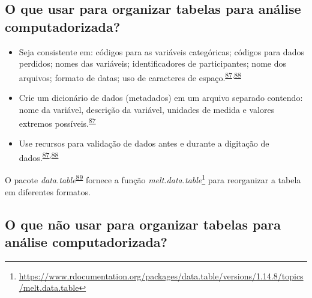 \documentclass[
  a4paper,
]{book}
\renewcommand{\href}[2]{#2\footnote{\url{#1}}}
\newenvironment{infobox}[1]
  {
  \begin{itemize}
  \renewcommand{\labelitemi}{
    \raisebox{-.7\height}[0pt][0pt]{
      {\setkeys{Gin}{width=3em,keepaspectratio}
        \texttt{[image: \#1]}}
    }
  }
  \setlength{\fboxsep}{1em}
  \begin{blackbox}
  \item
  }
  {
  \end{blackbox}
  \end{itemize}
  }
\begin{document}
\hypertarget{o-que-usar-para-organizar-tabelas-para-anuxe1lise-computadorizada}{%
\subsection{O que usar para organizar tabelas para análise computadorizada?}\label{o-que-usar-para-organizar-tabelas-para-anuxe1lise-computadorizada}}

\begin{itemize}
\item
  Seja consistente em: códigos para as variáveis categóricas; códigos para dados perdidos; nomes das variáveis; identificadores de participantes; nome dos arquivos; formato de datas; uso de caracteres de espaço.\textsuperscript{\protect\hyperlink{ref-broman2018}{87},\protect\hyperlink{ref-Juluru2015}{88}}
\item
  Crie um dicionário de dados (metadados) em um arquivo separado contendo: nome da variável, descrição da variável, unidades de medida e valores extremos possíveis.\textsuperscript{\protect\hyperlink{ref-broman2018}{87}}
\item
  Use recursos para validação de dados antes e durante a digitação de dados.\textsuperscript{\protect\hyperlink{ref-broman2018}{87},\protect\hyperlink{ref-Juluru2015}{88}}
\end{itemize}

\begin{infobox}{images/Rlogo}
O pacote \emph{data.table}\textsuperscript{\protect\hyperlink{ref-data.table}{89}} fornece a função \href{https://www.rdocumentation.org/packages/data.table/versions/1.14.8/topics/melt.data.table}{\emph{melt.data.table}} para reorganizar a tabela em diferentes formatos.

\end{infobox}

\hypertarget{o-que-nuxe3o-usar-para-organizar-tabelas-para-anuxe1lise-computadorizada}{%
\subsection{O que não usar para organizar tabelas para análise computadorizada?}\label{o-que-nuxe3o-usar-para-organizar-tabelas-para-anuxe1lise-computadorizada}}
\end{document}
